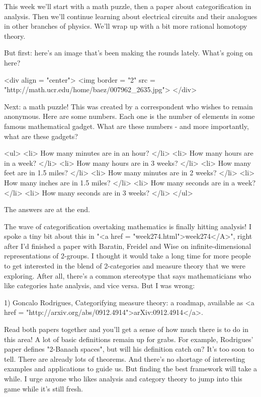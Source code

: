 


This week we'll start with a math puzzle, then a paper about
categorification in analysis.  Then we'll continue learning about
electrical circuits and their analogues in other branches of physics.
We'll wrap up with a bit more rational homotopy theory.  

But first: here's an image that's been making the rounds lately.
What's going on here?

<div align = "center">
<img border = "2" src = "http://math.ucr.edu/home/baez/007962_2635.jpg">
</div>

Next: a math puzzle!  This was created by a correspondent who wishes
to remain anonymous.   Here are some numbers.  Each one is the number of
elements in some famous mathematical gadget.  What are these numbers -
and more importantly, what are these gadgets?

<ul>
<li>
How many minutes are in an hour? 
</li>
<li>
How many hours are in a week?  
</li>
<li>
How many hours are in 3 weeks? 
</li>
<li>
How many feet are in 1.5 miles? 
</li>
<li>
How many minutes are in 2 weeks? 
</li>
<li>
How many inches are in 1.5 miles?
</li>
<li>
How many seconds are in a week?  
</li>
<li>
How many seconds are in 3 weeks? 
</li>
</ul>

The answers are at the end. 

The wave of categorification overtaking mathematics is finally hitting
analysis!  I spoke a tiny bit about this in "<a href =
"week274.html">week274</A>", right after I'd finished a paper
with Baratin, Freidel and Wise on infinite-dimensional representations
of 2-groups.  I thought it would take a long time for more people to
get interested in the blend of 2-categories and measure theory that we
were exploring.  After all, there's a common stereotype that says
mathematicians who like categories hate analysis, and vice versa.
But I was wrong:

1) Goncalo Rodrigues, Categorifying measure theory: a roadmap,
available as <a href = "http://arxiv.org/abs/0912.4914">arXiv:0912.4914</a>.

Read both papers together and you'll get a sense of how much there is
to do in this area!  A lot of basic definitions remain up for grabs.
For example, Rodrigues' paper defines "2-Banach spaces", but
will his definition catch on?  It's too soon to tell.  There are
already lots of theorems.  And there's no shortage of interesting
examples and applications to guide us.  But finding the best framework
will take a while.  I urge anyone who likes analysis and category
theory to jump into this game while it's still fresh.

